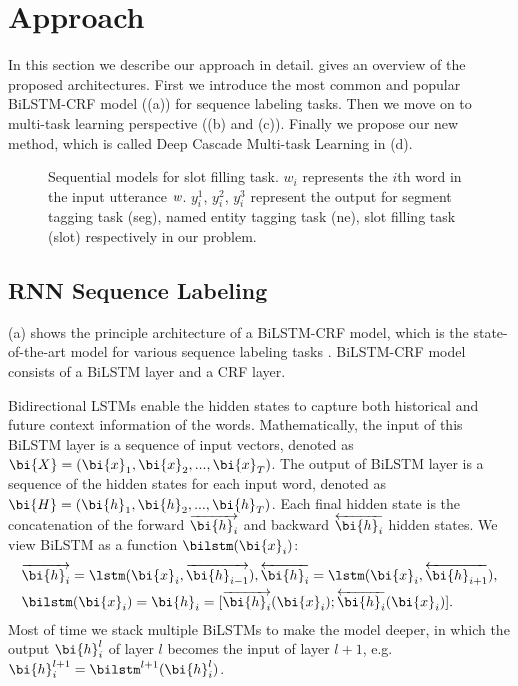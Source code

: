 \section{Approach}
\label{sec:model}
In this section we describe our approach in detail.
 gives an overview of the proposed architectures.
First we introduce the most common and popular BiLSTM-CRF
model ((a)) for sequence labeling tasks.
Then we move on to multi-task learning perspective 
((b) and (c)).
Finally we propose our new method, which is called
Deep Cascade Multi-task Learning in (d).

\begin{figure}[th]
	\centering
	\caption{Sequential models for slot filling task.
		$w_i$ represents the $i$th word in the input utterance $\emph{w}$.
		$y_i^1$, $y_i^2$, $y_i^3$ represent the output for segment tagging task (seg), named entity tagging task (ne), slot filling task (slot) respectively in our problem.}
	\label{fig:model}
\end{figure}

\subsection{RNN Sequence Labeling}
\label{sec:rnn_sequence_labeling}

(a) 
shows the principle architecture of a BiLSTM-CRF model,
which is the state-of-the-art model for various sequence labeling tasks \cite{huang2015bidirectional,reimers2017optimal}.
BiLSTM-CRF model consists of a BiLSTM layer and a CRF layer. 

Bidirectional LSTMs enable the
hidden states to capture both historical and future
context information of the words.
Mathematically, the input of this BiLSTM layer
is a sequence of input vectors,
denoted as $\bi{X}=(\bi{x}_1, \bi{x}_2, ..., \bi{x}_T)$.
The output of BiLSTM layer is a sequence of the hidden
states for each input word, denoted
as $\bi{H}=(\bi{h}_1, \bi{h}_2, ..., \bi{h}_T)$.
Each final hidden state is the concatenation of the forward
$\overrightarrow{\bi{h}_i}$ and backward $\overleftarrow{\bi{h}_i}$ hidden states.
We view BiLSTM as a function $\bilstm(\bi{x}_i)$:
\begin{eqnarray*}
	& \overrightarrow{\bi{h}_i} = \lstm(\bi{x}_i, \overrightarrow{\bi{h}_{i-1}}),
	\overleftarrow{\bi{h}_i} = \lstm(\bi{x}_i, \overleftarrow{\bi{h}_{i+1}}), \\
	& \bilstm(\bi{x}_i) = \bi{h}_i = [\overrightarrow{\bi{h}_i}(\bi{x}_i);\overleftarrow{\bi{h}_i}(\bi{x}_i)].
\end{eqnarray*}
Most of time we stack multiple BiLSTMs to make the model deeper,
in which the output $\bi{h}_i^l$ of layer $l$ becomes the input of layer $l+1$,
e.g. $\bi{h}_i^{l+1}=\bilstm^{l+1}(\bi{h}_i^l)$.

